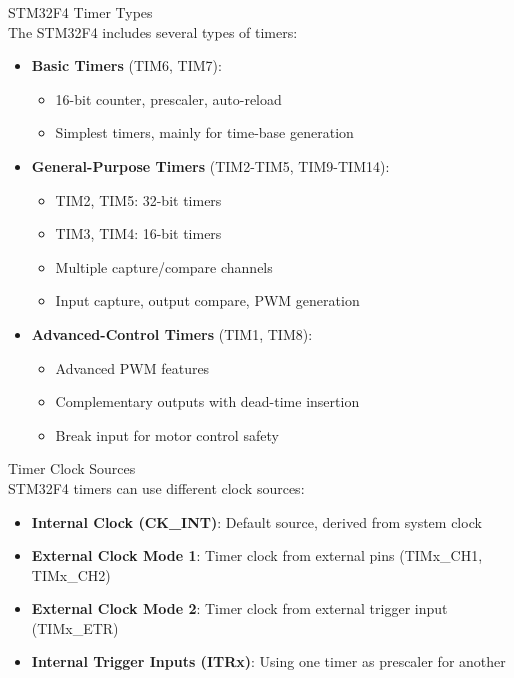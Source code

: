 \begin{concept}{STM32F4 Timer Types}\\
The STM32F4 includes several types of timers:
\begin{itemize}
    \item \textbf{Basic Timers} (TIM6, TIM7):
    \begin{itemize}
        \item 16-bit counter, prescaler, auto-reload
        \item Simplest timers, mainly for time-base generation
    \end{itemize}
    \item \textbf{General-Purpose Timers} (TIM2-TIM5, TIM9-TIM14):
    \begin{itemize}
        \item TIM2, TIM5: 32-bit timers
        \item TIM3, TIM4: 16-bit timers
        \item Multiple capture/compare channels
        \item Input capture, output compare, PWM generation
    \end{itemize}
    \item \textbf{Advanced-Control Timers} (TIM1, TIM8):
    \begin{itemize}
        \item Advanced PWM features
        \item Complementary outputs with dead-time insertion
        \item Break input for motor control safety
    \end{itemize}
\end{itemize}
\end{concept}

\begin{definition}{Timer Clock Sources}\\
STM32F4 timers can use different clock sources:
\begin{itemize}
    \item \textbf{Internal Clock (CK\_INT)}: Default source, derived from system clock
    \item \textbf{External Clock Mode 1}: Timer clock from external pins (TIMx\_CH1, TIMx\_CH2)
    \item \textbf{External Clock Mode 2}: Timer clock from external trigger input (TIMx\_ETR)
    \item \textbf{Internal Trigger Inputs (ITRx)}: Using one timer as prescaler for another
\end{itemize}
\end{definition}

